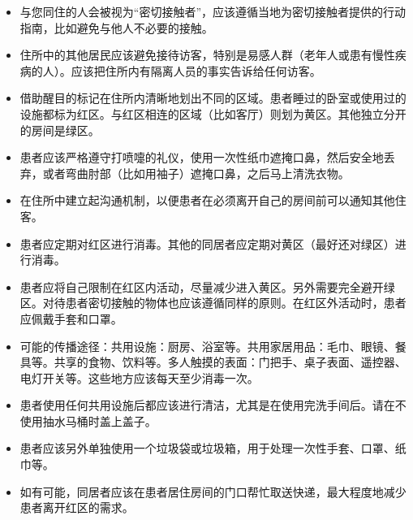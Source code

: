 \documentclass[onecolumn,journal]{IEEEtran}
\begin{document}
\begin{multicols}{2}
\begin{itemize}
  \item 与您同住的人会被视为“密切接触者”，应该遵循当地为密切接触者提供的行动指南，比如避免与他人不必要的接触。
  \item 住所中的其他居民应该避免接待访客，特别是易感人群（老年人或患有慢性疾病的人）。应该把住所内有隔离人员的事实告诉给任何访客。
  \item 借助醒目的标记在住所内清晰地划出不同的区域。患者睡过的卧室或使用过的设施都标为红区。与红区相连的区域（比如客厅）则划为黄区。其他独立分开的房间是绿区。
  \item 患者应该严格遵守打喷嚏的礼仪，使用一次性纸巾遮掩口鼻，然后安全地丢弃，或者弯曲肘部（比如用袖子）遮掩口鼻，之后马上清洗衣物。
  \item 在住所中建立起沟通机制，以便患者在必须离开自己的房间前可以通知其他住客。
  \item 患者应定期对红区进行消毒。其他的同居者应定期对黄区（最好还对绿区）进行消毒。
  \item 患者应将自己限制在红区内活动，尽量减少进入黄区。另外需要完全避开绿区。对待患者密切接触的物体也应该遵循同样的原则。在红区外活动时，患者应佩戴手套和口罩。
  \item 可能的传播途径：共用设施：厨房、浴室等。共用家居用品：毛巾、眼镜、餐具等。共享的食物、饮料等。多人触摸的表面：门把手、桌子表面、遥控器、电灯开关等。这些地方应该每天至少消毒一次。
  \item 患者使用任何共用设施后都应该进行清洁，尤其是在使用完洗手间后。请在不使用抽水马桶时盖上盖子。
  \item 患者应该另外单独使用一个垃圾袋或垃圾箱，用于处理一次性手套、口罩、纸巾等。
  \item 如有可能，同居者应该在患者居住房间的门口帮忙取送快递，最大程度地减少患者离开红区的需求。

\end{itemize}





\end{multicols}



% 
\end{document}

